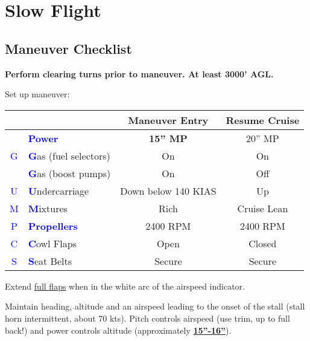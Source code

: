\newpage

\section{Slow Flight}
\subsection{Maneuver Checklist}

\textbf{Perform clearing turns prior to maneuver. At least 3000' AGL.}

Set up maneuver:

\begin{table}[H]
\centering
\begin{tabular}{|c|l|c|c|}
\hline
                    &                                                 & \textbf{Maneuver Entry} & \textbf{Resume Cruise} \\ \hline
                    & \textcolor{blue}{\textbf{Power}}                & \textbf{15'' MP}        & 20'' MP                \\ \hline
\textcolor{blue}{G} & \textcolor{blue}{\textbf{G}}as (fuel selectors) & On                      & On                     \\
                    & \textcolor{blue}{\textbf{G}}as (boost pumps)    & On                      & Off                    \\ \hline
\textcolor{blue}{U} & \textcolor{blue}{\textbf{U}}ndercarriage        & Down below 140 KIAS     & Up                     \\ \hline
\textcolor{blue}{M} & \textcolor{blue}{\textbf{M}}ixtures             & Rich                    & Cruise Lean            \\ \hline
\textcolor{blue}{P} & \textcolor{blue}{\textbf{Propellers}}           & 2400 RPM                & 2400 RPM               \\ \hline
\textcolor{blue}{C} & \textcolor{blue}{\textbf{C}}owl Flaps           & Open                    & Closed                 \\ \hline
\textcolor{blue}{S} & \textcolor{blue}{\textbf{S}}eat Belts           & Secure                  & Secure                 \\ \hline
\end{tabular}
\end{table}

Extend \underline{full flaps} when in the white arc of the airspeed indicator.

Maintain heading, altitude and an airspeed leading to the onset of the stall (stall horn intermittent, about 70 kts).
Pitch controls airspeed (use trim, up to full back!) and power controls altitude (approximately \underline{\textbf{15''-16''}}).

